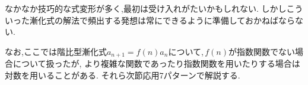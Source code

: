     なかなか技巧的な式変形が多く,最初は受け入れがたいかもしれない.
    しかしこういった漸化式の解法で頻出する発想は常にできるように準備しておかねばならない.

    なお,ここでは階比型漸化式$a_{n+1}=f(n)a_n$について,\,$f(n)$が指数関数でない場合について扱ったが,
    より複雑な関数であったり指数関数を用いたりする場合は対数を用いることがある.
    それら次節応用7パターンで解説する.
    
